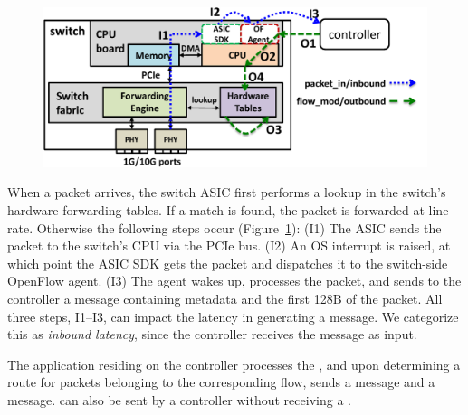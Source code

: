 
\begin{figure}
\centering
\includegraphics[width=0.98\columnwidth]{figs/openflow_switch.pdf}
\label{openflow_switch_delay}
\end{figure}

 When a packet arrives, the switch ASIC first
performs a lookup in the switch's hardware forwarding tables. If a match is
found, the packet is forwarded at line rate. Otherwise the following steps
occur (Figure~\ref{openflow_switch_delay}): (I1) The ASIC sends the packet to the switch's CPU via the PCIe bus. (I2) An OS
interrupt is raised, at which point the ASIC SDK gets the packet and
dispatches it to the switch-side OpenFlow agent. (I3) The agent wakes up,
processes the packet, and sends to the controller a \packetin message
containing metadata and the first 128B of the packet. All three steps,
I1--I3, can impact the latency in generating a \packetin message. We
categorize this as {\em inbound latency}, since the controller receives the
message as input.

\iffalse
The application residing on the controller
processes the \packetin, and upon determining a route for packets
belonging to the corresponding flow, sends a \flowmod message and a \packetout
message. \flowmod can also be sent by a controller without receiving a \packetin.

